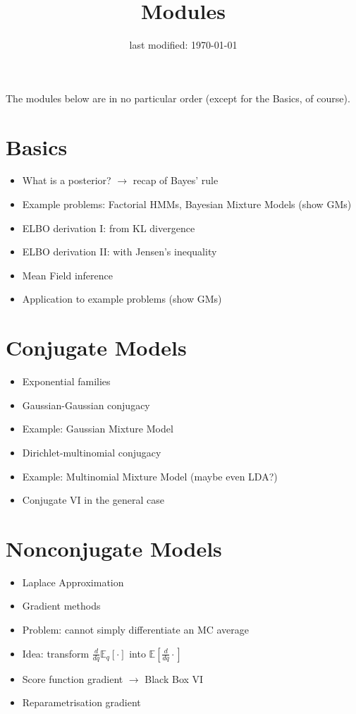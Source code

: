 \documentclass[11pt, a4paper]{article}
\title{Modules}
\date{last modified: \today}
\author{}
\begin{document}
\maketitle

The modules below are in no particular order (except for the Basics, of course).
 
\section{Basics}

\begin{itemize}
\item What is a posterior? $ \rightarrow $ recap of Bayes' rule
\item Example problems: Factorial HMMs, Bayesian Mixture Models (show GMs)
\item ELBO derivation I: from KL divergence
\item ELBO derivation II: with Jensen's inequality
\item Mean Field inference
\item Application to example problems (show GMs)
\end{itemize}

\section{Conjugate Models}
\begin{itemize}
\item Exponential families
\item Gaussian-Gaussian conjugacy
\item Example: Gaussian Mixture Model
\item Dirichlet-multinomial conjugacy
\item Example: Multinomial Mixture Model (maybe even LDA?)
\item Conjugate VI in the general case
\end{itemize}

\section{Nonconjugate Models}
\begin{itemize}
\item Laplace Approximation
\item Gradient methods
\item Problem: cannot simply differentiate an MC average
\item Idea: transform $ \frac{d}{dq} \mathbb{E}_{q}[\cdot] $ into $ \mathbb{E}[\frac{d}{dq}\cdot] $
\item Score function gradient $ \rightarrow $ Black Box VI
\item Reparametrisation gradient
\end{itemize}
\end{document}
